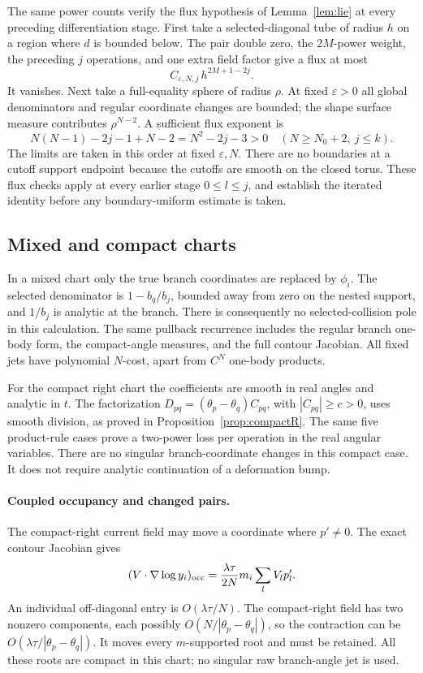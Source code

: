 \documentclass[11pt]{article}
\numberwithin{equation}{section}
\theoremstyle{definition}
\newcommand{\eps}{\varepsilon}
\begin{document}
The same power counts verify the flux hypothesis of
Lemma~\ref{lem:lie} at every preceding differentiation stage.
First take a selected-diagonal tube of radius \(h\) on a region
where \(d\) is bounded below. The pair double zero, the
\(2M\)-power weight, the preceding \(j\) operations, and one
extra field factor give a flux at most
\[
 C_{\eps,N,j}\,h^{2M+1-2j}.
\]
It vanishes. Next take a full-equality sphere of radius \(\rho\).
At fixed \(\eps>0\) all global denominators and regular coordinate
changes are bounded; the shape surface measure contributes
\(\rho^{N-2}\). A sufficient flux exponent is
\[
 N(N-1)-2j-1+N-2=N^2-2j-3>0
 \quad(N\ge N_0+2,\ j\le k).
\]
The limits are taken in this order at fixed \(\eps,N\).
There are no boundaries at a cutoff support endpoint because
the cutoffs are smooth on the closed torus. These flux checks
apply at every earlier stage \(0\le l\le j\), and establish the
iterated identity before any boundary-uniform estimate is taken.

\subsection{Mixed and compact charts}
In a mixed chart only the true branch coordinates are replaced
by \(\phi_i\). The selected denominator is \(1-b_q/b_j\), bounded
away from zero on the nested support, and \(1/b_j\) is analytic
at the branch. There is consequently no selected-collision pole
in this calculation. The same pullback recurrence includes the
regular branch one-body form, the compact-angle measures, and
the full contour Jacobian. All fixed jets have polynomial
\(N\)-cost, apart from \(C^N\) one-body products.

For the compact right chart the coefficients are smooth in real
angles and analytic in \(t\). The factorization
\(D_{pq}=(\theta_p-\theta_q)C_{pq}\), with \(|C_{pq}|\ge c>0\),
uses smooth division, as proved in Proposition~\ref{prop:compactR}.
The same five product-rule cases prove a two-power loss per
operation in the real angular variables. There are no singular
branch-coordinate changes in this compact case. It does not
require analytic continuation of a deformation bump.

\paragraph{Coupled occupancy and changed pairs.}
The compact-right current field may move a coordinate where
\(p'\ne0\). The exact contour Jacobian gives
\[
 (V\cdot\nabla\log y_i)_{\rm occ}
   =\frac{\lambda\tau}{2N}m_i\sum_l V_l p'_l.
\]
An individual off-diagonal entry is \(O(\lambda\tau/N)\).
The compact-right field has two nonzero components, each possibly
\(O(N/|\theta_p-\theta_q|)\), so the contraction can be
\(O(\lambda\tau/|\theta_p-\theta_q|)\). It moves every
\(m\)-supported root and must be retained. All these roots are
compact in this chart; no singular raw branch-angle jet is used.
\end{document}
